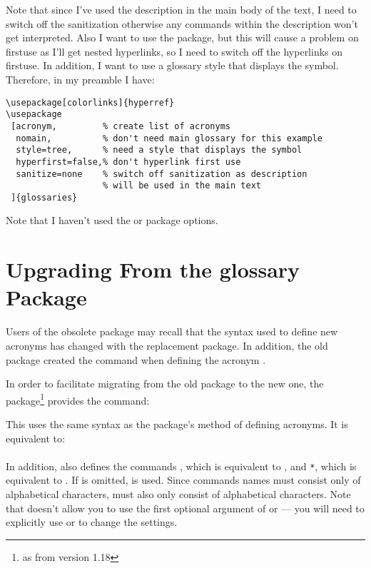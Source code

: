 \documentclass[report]{nlctdoc}
\begin{document}
Note that since I've used the description in the main body of the
text, I need to switch off the sanitization otherwise any commands
within the description won't get interpreted. Also I want to use the
 package, but this will cause a problem on \gls{firstuse}
as I'll get nested hyperlinks, so I need to switch off the
hyperlinks on \gls{firstuse}. In addition, I want to use a glossary style
that displays the symbol. Therefore, in my preamble I have:

\begin{verbatim}
\usepackage[colorlinks]{hyperref}
\usepackage
 [acronym,         % create list of acronyms
  nomain,          % don't need main glossary for this example
  style=tree,      % need a style that displays the symbol
  hyperfirst=false,% don't hyperlink first use
  sanitize=none    % switch off sanitization as description 
                   % will be used in the main text
 ]{glossaries}
\end{verbatim}

Note that I haven't used the  or
 package options.

\section{Upgrading From the glossary Package}
\label{sec:oldacronym}

Users of the obsolete  package may recall that
the syntax used to define new acronyms has changed with the
replacement  package. In addition, the old
 package created the command 
\cs{} when defining the acronym .

In order to facilitate migrating from the old package to the new
one, the  package\footnote{as from version 1.18} 
provides the command:
\begin{definition}[\DescribeMacro{\oldacronym}]
\end{definition}
This uses the same syntax as the  package's
method of defining acronyms. It is equivalent to:\\[10pt]
\\[10pt]
In addition,  also defines the commands
\cs{}, which is equivalent to ,
and \cs{}\texttt{*}, which is equivalent to
. If  is omitted, 
is used. Since commands names must consist only of alphabetical
characters,  must also only consist of alphabetical
characters. Note that \cs{} doesn't allow you to use
the first optional argument of  or  --- you will
need to explicitly use  or  to change the
settings.
\end{document}
